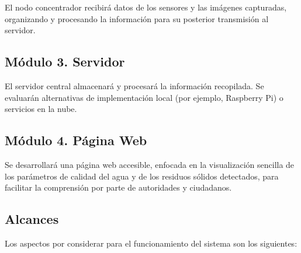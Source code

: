 El nodo concentrador recibir\'a datos de los sensores y las im\'agenes capturadas, organizando y procesando la informaci\'on para su posterior transmisi\'on al servidor.

\subsection{M\'odulo 3. Servidor}

El servidor central almacenar\'a y procesar\'a la informaci\'on recopilada. Se evaluar\'an alternativas de implementaci\'on local (por ejemplo, Raspberry Pi) o servicios en la nube.

\subsection{M\'odulo 4. P\'agina Web}

Se desarrollar\'a una p\'agina web accesible, enfocada en la visualizaci\'on sencilla de los par\'ametros de calidad del agua y de los residuos s\'olidos detectados, para facilitar la comprensi\'on por parte de autoridades y ciudadanos.

\subsection{Alcances}
Los aspectos por considerar para el funcionamiento del sistema son los siguientes:

